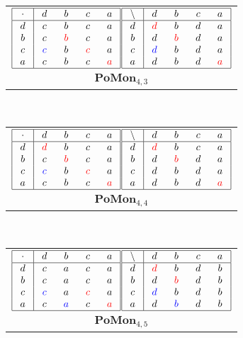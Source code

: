 \documentclass{amsart}
\newcommand{\g}{\textcolor{blue}}
\newcommand{\rd}{\textcolor{red}}
\newcommand{\W}[1]{\makebox[12pt]{$#1$}}%
\begin{document}
\begin{tabular}[b]{c}
$\begin{array}{|c|cccc|}\hline
\W{\cdot}&\W{d}&\W{b}&\W{c}&\W{a}\\\hline
d&c&b&c&a\\
b&c&\rd{b}&c&a\\
c&\g{c}&b&\rd{c}&a\\
a&c&b&c&\rd{a}\\
\hline
\end{array}$$\begin{array}{|c|cccc|}\hline
\W{\backslash}&\W{d}&\W{b}&\W{c}&\W{a}\\\hline
d&\rd{d}&b&d&a\\
b&d&\rd{b}&d&a\\
c&\g{d}&b&d&a\\
a&d&b&d&\rd{a}\\
\hline
\end{array}$\\
$\mathbf{PoMon}_{4,3}$
\end{tabular}
\ 
\begin{tabular}[b]{c}
$\begin{array}{|c|cccc|}\hline
\W{\cdot}&\W{d}&\W{b}&\W{c}&\W{a}\\\hline
d&\rd{d}&b&c&a\\
b&c&\rd{b}&c&a\\
c&\g{c}&b&\rd{c}&a\\
a&c&b&c&\rd{a}\\
\hline
\end{array}$$\begin{array}{|c|cccc|}\hline
\W{\backslash}&\W{d}&\W{b}&\W{c}&\W{a}\\\hline
d&\rd{d}&b&c&a\\
b&d&\rd{b}&d&a\\
c&d&b&d&a\\
a&d&b&d&\rd{a}\\
\hline
\end{array}$\\
$\mathbf{PoMon}_{4,4}$
\end{tabular}
\ 
\begin{tabular}[b]{c}
$\begin{array}{|c|cccc|}\hline
\W{\cdot}&\W{d}&\W{b}&\W{c}&\W{a}\\\hline
d&c&a&c&a\\
b&c&a&c&a\\
c&\g{c}&a&\rd{c}&a\\
a&c&\g{a}&c&\rd{a}\\
\hline
\end{array}$$\begin{array}{|c|cccc|}\hline
\W{\backslash}&\W{d}&\W{b}&\W{c}&\W{a}\\\hline
d&\rd{d}&b&d&b\\
b&d&\rd{b}&d&b\\
c&\g{d}&b&d&b\\
a&d&\g{b}&d&b\\
\hline
\end{array}$\\
$\mathbf{PoMon}_{4,5}$
\end{tabular}
\end{document}
